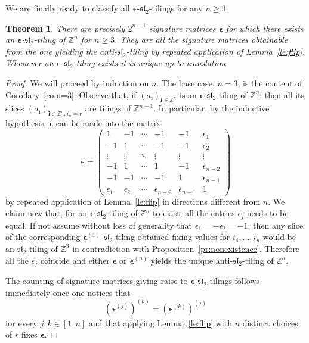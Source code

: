 \documentclass{amsart}
\newcommand{\sayLD}[1]{\say[LD]{#1}}
\newtheorem{theorem}{Theorem}
\newcommand{\bepsilon}{\boldsymbol{\epsilon}}
\newcommand{\bi}{\boldsymbol{i}}
\newcommand{\fsl}{\mathfrak{sl}}
\newcommand{\ZZ}{\mathbb{Z}}
\begin{document}
  We are finally ready to classify all $\bepsilon$-$\fsl_2$-tilings for any $n\geq3$.
  \begin{theorem}
    There are precisely $2^{n-1}$ signature matrices $\bepsilon$ for which there exists an $\bepsilon$-$\fsl_2$-tiling of $\ZZ^n$ for $n\geq3$.
    They are all the signature matrices obtainable from the one yielding the anti-$\fsl_2$-tiling by repeated application of Lemma~\ref{le:flip}.
    Whenever an $\bepsilon$-$\fsl_2$-tiling exists it is unique up to translation.
  \end{theorem}
  \begin{proof} \sayLD{proof can be shortened (see after)}
    We will proceed by induction on $n$. 
    The base case, $n=3$, is the content of Corollary~\ref{co:n=3}.
    Observe that, if $(a_{\bi})_{\bi\in\ZZ^n}$ is an $\bepsilon$-$\fsl_2$-tiling of $\ZZ^n$, then all its slices $(a_{\bi})_{\bi\in\ZZ^n,i_n=r}$ are tilings of $\ZZ^{n-1}$.
    In particular, by the inductive hypothesis, $\bepsilon$ can be made into the matrix
    \[
      \bepsilon = 
      \left(
        \begin{array}{cccccc}
          1          & -1         & \cdots & -1             & -1             & \epsilon_1     \\
          -1         & 1          & \cdots & -1             & -1             & \epsilon_2     \\
          \vdots     & \vdots     & \ddots & \vdots         & \vdots         & \vdots          \\
          -1         & 1          & \cdots & 1              & -1             & \epsilon_{n-2} \\
          -1         & -1         & \cdots & -1             & 1              & \epsilon_{n-1} \\
          \epsilon_1 & \epsilon_2 & \cdots & \epsilon_{n-2} & \epsilon_{n-1} & 1
        \end{array}
      \right)
    \]
    by repeated application of Lemma~\ref{le:flip} in directions different from $n$.
    We claim now that, for an $\bepsilon$-$\fsl_2$-tiling of $\ZZ^n$ to exist, all the entries $\epsilon_j$ needs to be equal. 
    If not assume without loss of generality that $\epsilon_1 = -\epsilon_2 = -1$; then any slice of the corresponding $\bepsilon^{(1)}$-$\fsl_2$-tiling obtained fixing values for $i_4,\dots,i_n$ would be an $\fsl_2$-tiling of $\ZZ^3$ in contradiction with Proposition~\ref{pr:nonexistence}.
    Therefore all the $\epsilon_j$ coincide and either $\bepsilon$ or $\bepsilon^{(n)}$ yields the unique anti-$\fsl_2$-tiling of $\ZZ^n$.

    The counting of signature matrices giving raise to $\bepsilon$-$\fsl_2$-tilings follows immediately once one notices that 
    \[
      \left(\bepsilon^{(j)}\right)^{(k)}=\left(\bepsilon^{(k)}\right)^{(j)}
    \]
    for every $j,k\in[1,n]$ and that applying Lemma~\ref{le:flip} with $n$ distinct choices of $r$ fixes $\bepsilon$.
  \end{proof}
\end{document}
